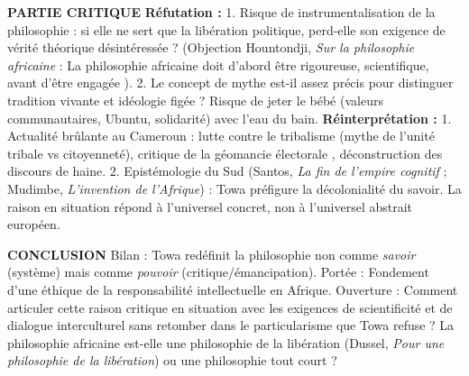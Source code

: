 \documentclass[11pt]{article}
\newcommand{\cle}[1]{{\popxbold\color{popdark}#1}}
\begin{document}
\begin{exoresolu}
\textbf{PARTIE CRITIQUE}
\textbf{Réfutation :} 1. Risque de \guillemotleft instrumentalisation \guillemotright de la philosophie : si elle ne sert que la libération politique, perd-elle son exigence de vérité théorique désintéressée ? (Objection \cle{Hountondji}, \emph{Sur la philosophie africaine} : \guillemotleft La philosophie africaine doit d'abord être rigoureuse, scientifique, avant d'être engagée \guillemotright). 2. Le concept de \guillemotleft mythe \guillemotright est-il assez précis pour distinguer tradition vivante et idéologie figée ? Risque de jeter le bébé (valeurs communautaires, \cle{Ubuntu}, solidarité) avec l'eau du bain.
\textbf{Réinterprétation :} 1. Actualité brûlante au Cameroun : lutte contre le \cle{tribalisme} (mythe de l'unité tribale vs citoyenneté), critique de la \guillemotleft géomancie électorale \guillemotright, déconstruction des discours de haine. 2. \cle{Epistémologie du Sud} (Santos, \emph{La fin de l'empire cognitif} ; Mudimbe, \emph{L'invention de l'Afrique}) : Towa préfigure la \cle{décolonialité} du savoir. La \guillemotleft raison en situation \guillemotright répond à l'universel concret, non à l'universel abstrait européen.

\textbf{CONCLUSION}
Bilan : Towa redéfinit la philosophie non comme \emph{savoir} (système) mais comme \emph{pouvoir} (critique/émancipation). Portée : Fondement d'une éthique de la responsabilité intellectuelle en Afrique. Ouverture : Comment articuler cette \guillemotleft raison critique en situation \guillemotright avec les exigences de scientificité et de dialogue interculturel sans retomber dans le particularisme que Towa refuse ? La philosophie africaine est-elle une \cle{philosophie de la libération} (Dussel, \emph{Pour une philosophie de la libération}) ou une \cle{philosophie tout court} ?
\end{exoresolu}
\end{document}
